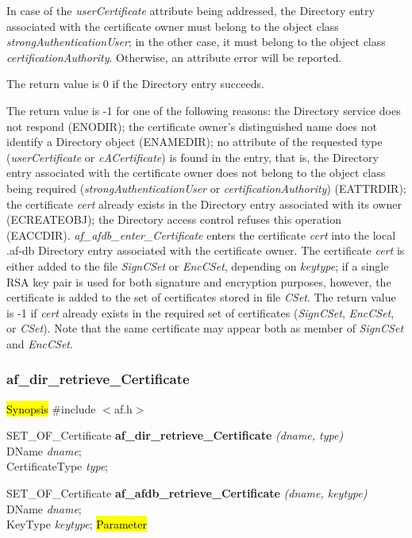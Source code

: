 In case of the {\em userCertificate} attribute being addressed, the Directory entry
associated with the certificate owner must belong to the object class
{\em strongAuthenticationUser}; in the other case, it must belong to the
object class {\em certificationAuthority}. Otherwise, an attribute error will be
reported.

The return value is 0 if the Directory entry succeeds.

The return value is -1 for one of the following reasons:
\bi
\m the Directory service does not respond (ENODIR);
\m the certificate owner's distinguished name does not identify a Directory object (ENAMEDIR);
\m no attribute of the requested type ({\em userCertificate} or {\em cACertificate}) is found 
in the entry, that is, the Directory entry associated with the certificate owner does not
belong to the object class being required ({\em strongAuthenticationUser} or 
{\em certificationAuthority}) (EATTRDIR);
\m the certificate {\em cert} already exists in the Directory entry associated with 
its owner (ECREATEOBJ);
\m the Directory access control refuses this operation (EACCDIR).
\ei
{\em af\_afdb\_enter\_Certificate} enters the certificate {\em cert} into the local .af-db
Directory entry associated with the certificate owner. The certificate {\em cert} is either 
added to the file {\em SignCSet} or {\em EncCSet}, depending on {\em keytype}; if a single RSA key pair is used for both signature and encryption purposes, however, the certificate is added to the
set of certificates stored in file {\em CSet}. 
The return value is -1 if {\em cert} already exists in the required set of certificates
({\em SignCSet}, {\em EncCSet}, or {\em CSet}). Note that the same
certificate may appear both as member of {\em SignCSet} and {\em EncCSet}.


\subsubsection{af\_dir\_retrieve\_Certificate}
\hl{Synopsis}
\#include $<$af.h$>$

SET\_OF\_Certificate {\bf *af\_dir\_retrieve\_Certificate} {\em (dname, type)} \\
DName {\em *dname}; \\
CertificateType {\em type}; 

SET\_OF\_Certificate {\bf *af\_afdb\_retrieve\_Certificate} {\em (dname, keytype)} \\
DName {\em *dname}; \\
KeyType {\em keytype};
\hl{Parameter}

